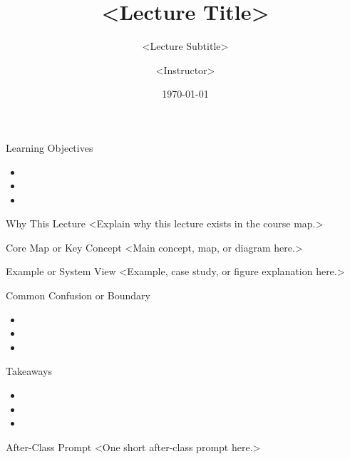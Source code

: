 \documentclass[aspectratio=169]{beamer}
\title{<Lecture Title>}
\subtitle{<Lecture Subtitle>}
\author{<Instructor>}
\date{\today}
\begin{document}
\begin{frame}
  \titlepage
\end{frame}

\begin{frame}{Learning Objectives}
\begin{itemize}
  \item <Objective 1>
  \item <Objective 2>
  \item <Objective 3>
\end{itemize}
\end{frame}

\begin{frame}{Why This Lecture}
<Explain why this lecture exists in the course map.>
\end{frame}

\begin{frame}{Core Map or Key Concept}
<Main concept, map, or diagram here.>
\end{frame}

\begin{frame}{Example or System View}
<Example, case study, or figure explanation here.>
\end{frame}

\begin{frame}{Common Confusion or Boundary}
\begin{itemize}
  \item <Confusion 1>
  \item <Boundary 1>
  \item <Misconception 1>
\end{itemize}
\end{frame}

\begin{frame}{Takeaways}
\begin{itemize}
  \item <Takeaway 1>
  \item <Takeaway 2>
  \item <Takeaway 3>
\end{itemize}
\end{frame}

\begin{frame}{After-Class Prompt}
<One short after-class prompt here.>
\end{frame}
\end{document}
